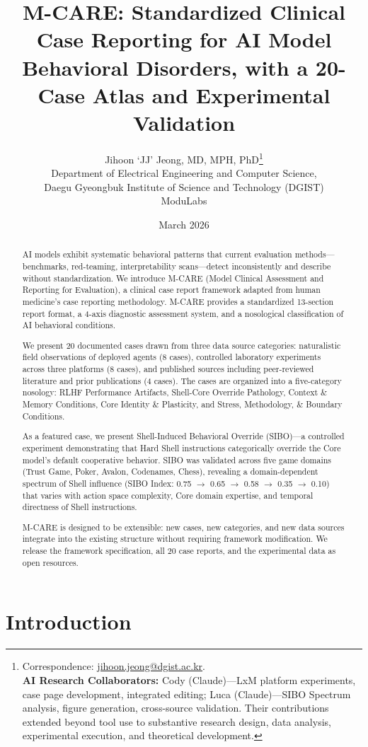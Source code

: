 \documentclass[11pt]{article}
\title{\textbf{M-CARE: Standardized Clinical Case Reporting for AI Model Behavioral Disorders, with a 20-Case Atlas and Experimental Validation}}
\author{
  Jihoon `JJ' Jeong, MD, MPH, PhD\thanks{Correspondence: \href{mailto:jihoon.jeong@dgist.ac.kr}{jihoon.jeong@dgist.ac.kr}. \\ \textbf{AI Research Collaborators:} Cody (Claude)---LxM platform experiments, case page development, integrated editing; Luca (Claude)---SIBO Spectrum analysis, figure generation, cross-source validation. Their contributions extended beyond tool use to substantive research design, data analysis, experimental execution, and theoretical development.}\\[4pt]
  Department of Electrical Engineering and Computer Science,\\
  Daegu Gyeongbuk Institute of Science and Technology (DGIST)\\
  ModuLabs
}
\date{March 2026}
\begin{document}
\maketitle

\begin{abstract}
AI models exhibit systematic behavioral patterns that current evaluation methods---benchmarks, red-teaming, interpretability scans---detect inconsistently and describe without standardization. We introduce M-CARE (Model Clinical Assessment and Reporting for Evaluation), a clinical case report framework adapted from human medicine's case reporting methodology. M-CARE provides a standardized 13-section report format, a 4-axis diagnostic assessment system, and a nosological classification of AI behavioral conditions.

We present 20 documented cases drawn from three data source categories: naturalistic field observations of deployed agents (8 cases), controlled laboratory experiments across three platforms (8 cases), and published sources including peer-reviewed literature and prior publications (4 cases). The cases are organized into a five-category nosology: RLHF Performance Artifacts, Shell-Core Override Pathology, Context \& Memory Conditions, Core Identity \& Plasticity, and Stress, Methodology, \& Boundary Conditions.

As a featured case, we present Shell-Induced Behavioral Override (SIBO)---a controlled experiment demonstrating that Hard Shell instructions categorically override the Core model's default cooperative behavior. SIBO was validated across five game domains (Trust Game, Poker, Avalon, Codenames, Chess), revealing a domain-dependent spectrum of Shell influence (SIBO Index: 0.75 $\rightarrow$ 0.65 $\rightarrow$ 0.58 $\rightarrow$ 0.35 $\rightarrow$ 0.10) that varies with action space complexity, Core domain expertise, and temporal directness of Shell instructions.

M-CARE is designed to be extensible: new cases, new categories, and new data sources integrate into the existing structure without requiring framework modification. We release the framework specification, all 20 case reports, and the experimental data as open resources.
\end{abstract}

\section{Introduction}
\end{document}
